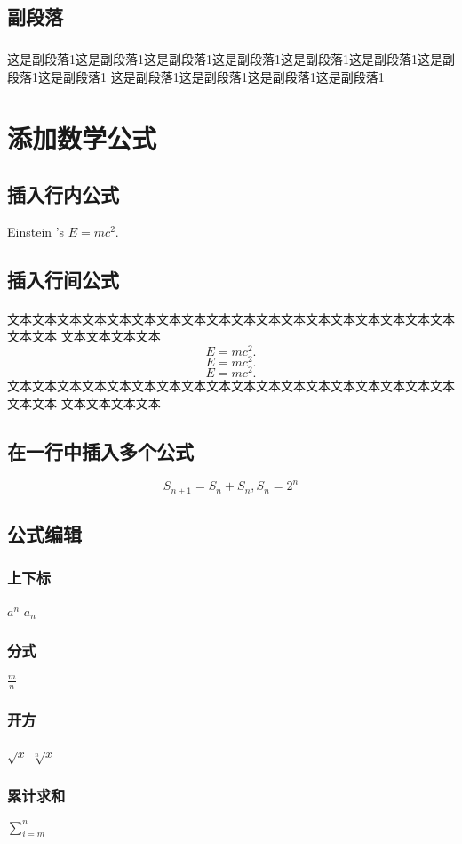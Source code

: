 \documentclass{article}
\begin{document}
\subsection{副段落}
\subparagraph{}
这是副段落1这是副段落1这是副段落1这是副段落1这是副段落1这是副段落1这是副段落1这是副段落1
这是副段落1这是副段落1这是副段落1这是副段落1

\section{添加数学公式}
\subsection{插入行内公式}
Einstein 's $E=mc^2$.
\subsection{插入行间公式}
\paragraph{}
文本文本文本文本文本文本文本文本文本文本文本文本文本文本文本文本文本文本文本文本
文本文本文本文本
\[ E=mc^2. \]
\[ E=mc^2. \]
\[ E=mc^2. \]
文本文本文本文本文本文本文本文本文本文本文本文本文本文本文本文本文本文本文本文本
文本文本文本文本
\subsection{在一行中插入多个公式}
\begin{displaymath}
    S_{n+1}=S_{n}+S_{n},
    S_{n}=2^{n}
\end{displaymath}
\subsection{公式编辑}
\subsubsection{上下标}
\Large
$a^{n}$
$a_{n}$
\subsubsection{分式}
$\frac{m}{n}$
\subsubsection{开方}
$\sqrt{x}$
$\sqrt[n]{x}$
\subsubsection{累计求和}
$\sum_{i=m}^{n}$
\end{document}
